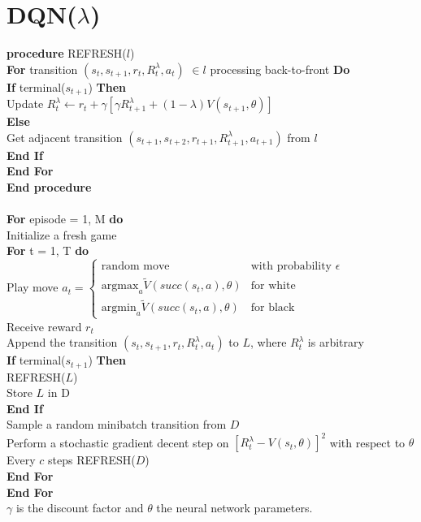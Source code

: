 \documentclass{article}
\begin{document}
\pagebreak

\section{DQN($\lambda$)}
\textbf{procedure} REFRESH($l$) \\
\indent \textbf{For} transition $(s_t, s_{t+1}, r_t, R_t^\lambda, a_t)$ $\in l$ processing back-to-front \textbf{Do} \\
\indent \indent \textbf{If} terminal($s_{t+1}$) \textbf{Then} \\
\indent \indent \indent Update $R_t^\lambda \leftarrow r_t + \gamma [\gamma R_{t+1}^\lambda + (1 - \lambda) V(s_{t+1}, \theta)]$ \\
\indent \indent \textbf{Else} \\
\indent \indent \indent Get adjacent transition $(s_{t+1}, s_{t+2}, r_{t+1}, R_{t+1}^\lambda, a_{t+1})$ from $l$ \\
\indent \indent \textbf{End If} \\
\indent \textbf{End For} \\
\textbf{End procedure} \\
\\
\textbf{For} episode = 1, M \textbf{do} \\
\indent Initialize a fresh game \\
\indent \textbf {For} t = 1, T \textbf{do} \\
\indent \indent Play move
$
a_t= 
\begin{cases}
\text{random move} 									& \text{with probability } \epsilon \\
\text{argmax}_a \tilde{V}(succ(s_t, a), \theta)     & \text{for white} \\
\text{argmin}_a \tilde{V}(succ(s_t, a), \theta)     & \text{for black}
\end{cases}
$ \\
\indent \indent Receive reward $r_t$  \\
\indent \indent Append the transition $(s_t, s_{t+1}, r_t,  R_t^\lambda, a_t)$ to $L$, where $R_t^\lambda$ is arbitrary\\
\indent \indent \textbf{If} terminal($s_{t+1}$) \textbf{Then} \\
\indent \indent \indent REFRESH($L$) \\
\indent \indent \indent Store $L$ in D \\
\indent \indent \textbf{End If} \\
\indent \indent Sample a random minibatch transition from $D$  \\
\indent \indent Perform a stochastic gradient decent step on $[R_t^\lambda - V(s_t, \theta)]^2$ with respect to $\theta$  \\
\indent \indent Every $c$ steps REFRESH($D$)   \\
\indent  \textbf{End For}  \\
\textbf{End For} \\

\noindent $\gamma$ is the discount factor and $\theta$ the neural network parameters.

\pagebreak
\end{document}
